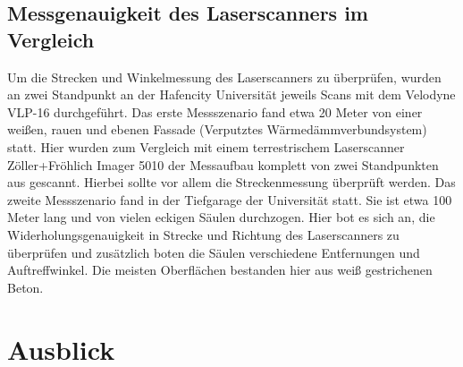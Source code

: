 \documentclass[a4paper,12pt,bibliography=totoc, listof=totoc,titlepage,pointlessnumbers]{scrreprt}
\begin{document}
\section{Messgenauigkeit des Laser\-scan\-ners im Vergleich}
Um die Strecken und Winkelmessung des Laserscanners zu überprüfen, wurden an zwei Standpunkt an der Hafencity Universität jeweils Scans mit dem Velodyne VLP-16 durchgeführt. Das erste Messszenario fand etwa 20 Meter von einer weißen, rauen und ebenen Fassade (Verputztes Wärmedämmverbundsystem) statt. Hier wurden zum Vergleich mit einem terrestrischem Laserscanner Zöller+Fröhlich Imager 5010 der Messaufbau komplett von zwei Standpunkten aus gescannt. Hierbei sollte vor allem die Streckenmessung überprüft werden. Das zweite Messszenario fand in der Tiefgarage der Universität statt. Sie ist etwa 100 Meter lang und von vielen eckigen Säulen durchzogen. Hier bot es sich an, die Widerholungsgenauigkeit in Strecke und Richtung des Laserscanners zu überprüfen und zusätzlich boten die Säulen verschiedene Entfernungen und Auftreffwinkel. Die meisten Oberflächen bestanden hier aus weiß gestrichenen Beton.



\chapter{Ausblick}
\label{c:ausblick}


\renewcommand\UrlFont\itshape


\listoffigures
\listoftables
\end{document}
